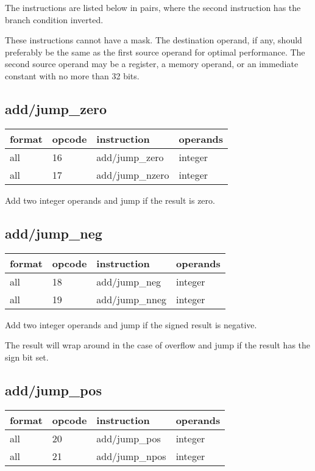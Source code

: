 \documentclass[forwardcom.tex]{subfiles}
\begin{document}
The instructions are listed below in pairs, where the second instruction has the branch condition inverted. 
\vv

These instructions cannot have a mask. 
The destination operand, if any, should preferably be the same as the first source operand for optimal performance. The second source operand may be a register, a memory operand, or an immediate constant with no more than 32 bits.
\vv


\subsection{add/jump\_zero}
\label{table:addJumpZeroInstruction}
\begin{tabular}{|p{16mm}|p{12mm}|p{60mm}|p{50mm}|}
\hline
\bfseries format & \bfseries opcode & \bfseries instruction & \bfseries operands \\ \hline
all & 16 & add/jump\_zero & integer \\ \hline
all & 17 & add/jump\_nzero & integer\\ \hline
\end{tabular}
\vv

Add two integer operands and jump if the result is zero.


\subsection{add/jump\_neg}
\label{table:addJumpNegInstruction}
\begin{tabular}{|p{16mm}|p{12mm}|p{60mm}|p{50mm}|}
\hline
\bfseries format & \bfseries opcode & \bfseries instruction & \bfseries operands \\ \hline
all & 18 & add/jump\_neg & integer \\ \hline
all & 19 & add/jump\_nneg & integer\\ \hline
\end{tabular}
\vv

Add two integer operands and jump if the signed result is negative.

The result will wrap around in the case of overflow and jump if the result has the sign bit set.


\subsection{add/jump\_pos}
\label{table:addJumpPosInstruction}
\begin{tabular}{|p{16mm}|p{12mm}|p{60mm}|p{50mm}|}
\hline
\bfseries format & \bfseries opcode & \bfseries instruction & \bfseries operands \\ \hline
all & 20 & add/jump\_pos & integer \\ \hline
all & 21 & add/jump\_npos & integer\\ \hline
\end{tabular}
\vv
\end{document}
